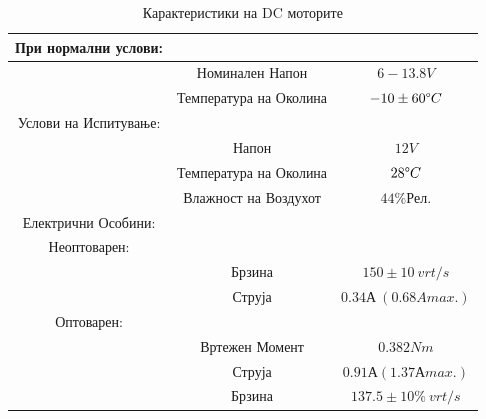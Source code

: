 \documentclass[12pt]{article}
\begin{document}
      \begin{table}[h]
        \caption{Карактеристики на DC моторите}
        \label{tab:dcmotor}
        \begin{center}
          \begin{tabular}{||c|c|c||}
            \hline
            При нормални услови: & & \\
            \hline
             & Номинален Напон & $6-13.8V$\\
             & Температура на Околина & $-10 \pm 60 \degree C$\\
            \hline
            Услови на Испитување: & & \\
            \hline
            & Напон & $12V$ \\
            & Температура на Околина & $28 \degree C$\\
            & Влажност на Воздухот & $44\% Рел.$\\
            \hline
            Електрични Особини: & & \\
            \hline
            Неоптоварен: & & \\
            \hline
            & Брзина & $150 \pm 10 \ vrt/s$ \\
            & Струја & $0.34А\ (0.68A max.)$ \\
            \hline
            Оптоварен: & &\\
            \hline
            & Вртежен Момент & $0.382Nm $\\
            & Струја & $0.91А (1.37А max.)$\\
            & Брзина & $137.5 \pm 10 \%\ vrt/s$\\
            \hline
          \end{tabular}
        \end{center}
      \end{table}
\end{document}
